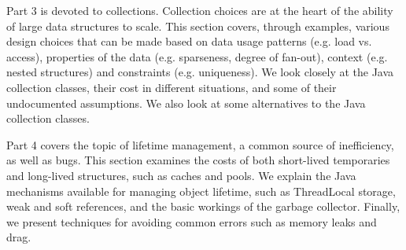 Part 3 is devoted to collections. Collection choices are at the heart of the
ability of large data structures to scale. This section covers, through
examples, various design choices that can be made based on data usage patterns
(e.g. load vs. access), properties of the data (e.g. sparseness, degree of
fan-out), context (e.g. nested structures) and constraints (e.g. uniqueness). 
We look closely at the Java collection classes, their cost in different
situations, and some of their undocumented assumptions. We also look at some
alternatives to the Java collection classes.
 
Part 4 covers the topic of lifetime management, a common source of inefficiency,
as well as bugs. This section examines the costs of both short-lived temporaries
and long-lived structures, such as caches and pools.  We explain the Java
mechanisms available for managing object lifetime, such as ThreadLocal storage,
weak and soft references, and the basic workings of the garbage collector.
Finally, we present techniques for avoiding common errors such as memory leaks
and drag. %

